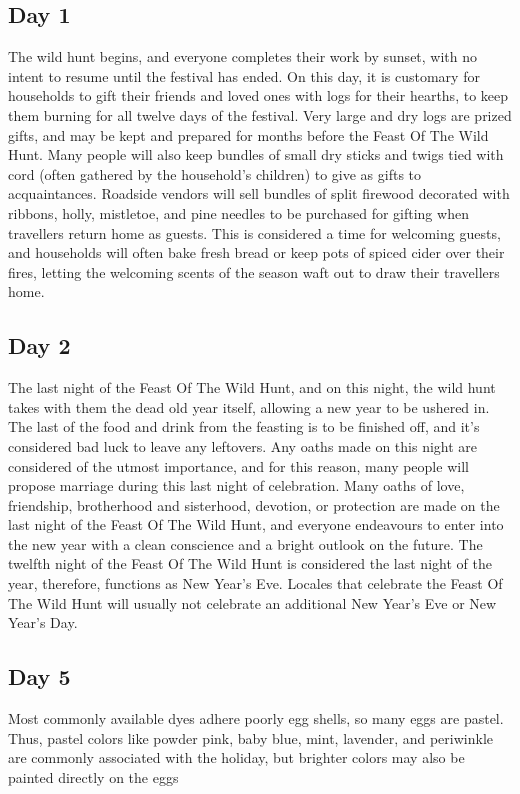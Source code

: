 \documentclass[10pt,a4paper,twoside,twocolumn,openany,bg=print,nodeprecatedcode]{dndbook}
\begin{document}
\subsection{Day 1}
The wild hunt begins, and everyone completes their work by sunset, with no intent to resume until the festival has ended. On this day, it is customary for households to gift their friends and loved ones with logs for their hearths, to keep them burning for all twelve days of the festival. Very large and dry logs are prized gifts, and may be kept and prepared for months before the Feast Of The Wild Hunt. Many people will also keep bundles of small dry sticks and twigs tied with cord (often gathered by the household's children) to give as gifts to acquaintances. Roadside vendors will sell bundles of split firewood decorated with ribbons, holly, mistletoe, and pine needles to be purchased for gifting when travellers return home as guests. This is considered a time for welcoming guests, and households will often bake fresh bread or keep pots of spiced cider over their fires, letting the welcoming scents of the season waft out to draw their travellers home.
\subsection{Day 2}
The last night of the Feast Of The Wild Hunt, and on this night, the wild hunt takes with them the dead old year itself, allowing a new year to be ushered in. The last of the food and drink from the feasting is to be finished off, and it's considered bad luck to leave any leftovers. Any oaths made on this night are considered of the utmost importance, and for this reason, many people will propose marriage during this last night of celebration. Many oaths of love, friendship, brotherhood and sisterhood, devotion, or protection are made on the last night of the Feast Of The Wild Hunt, and everyone endeavours to enter into the new year with a clean conscience and a bright outlook on the future.
The twelfth night of the Feast Of The Wild Hunt is considered the last night of the year, therefore, functions as New Year's Eve. Locales that celebrate the Feast Of The Wild Hunt will usually not celebrate an additional New Year's Eve or New Year's Day.
\subsection{Day 5}
Most commonly available dyes adhere poorly egg shells, so many eggs are pastel. Thus, pastel colors like powder pink, baby blue, mint, lavender, and periwinkle are commonly associated with the holiday, but brighter colors may also be painted directly on the eggs
\end{document}

